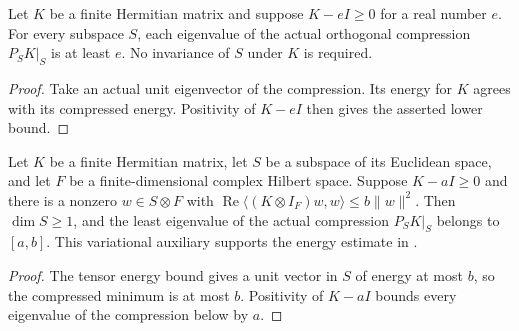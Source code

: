 \begin{lemma}
    \label{lem:compression_eigenvalues_scalar_lower}
    \leanok
    Let $K$ be a finite Hermitian matrix and suppose $K-eI\ge0$ for
    a real number $e$. For every subspace $S$, each eigenvalue of the
    actual orthogonal compression $P_SK|_S$ is at least $e$.
    No invariance of $S$ under $K$ is required.
\end{lemma}
\begin{proof}\leanok
    Take an actual unit eigenvector of the compression. Its energy for
    $K$ agrees with its compressed energy. Positivity of $K-eI$ then
    gives the asserted lower bound.
\end{proof}


\begin{theorem}
    \label{thm:compression_minimum_tensor_interval}
    \leanok
    Let $K$ be a finite Hermitian matrix, let $S$ be a subspace of its
    Euclidean space, and let $F$ be a finite-dimensional complex Hilbert
    space. Suppose $K-aI\ge0$ and there is a nonzero $w\in S\otimes F$
    with $\operatorname{Re}\langle(K\otimes I_F)w,w\rangle\le b\|w\|^2$.
    Then $\dim S\ge1$, and the least eigenvalue of the actual compression
    $P_SK|_S$ belongs to $[a,b]$.
    This variational auxiliary supports the energy estimate in
    \cite[lines 1793--1807]{Arad2016RigorousRG}.
\end{theorem}
\begin{proof}\leanok
    The tensor energy bound gives a unit vector in $S$ of energy at most
    $b$, so the compressed minimum is at most $b$. Positivity of $K-aI$
    bounds every eigenvalue of the compression below by $a$.
\end{proof}
